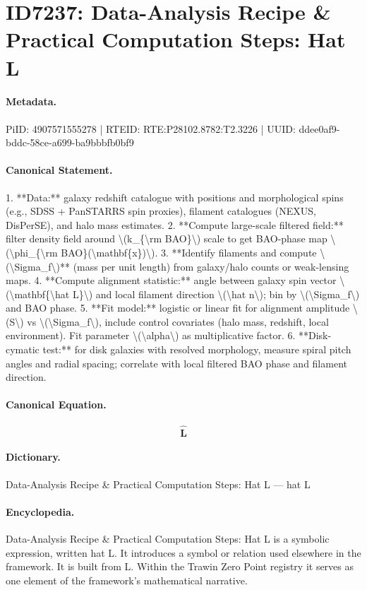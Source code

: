 \section*{ID7237: Data-Analysis Recipe \& Practical Computation Steps: Hat L}
\paragraph{Metadata.}
PiID: 4907571555278 | RTEID: RTE:P28102.8782:T2.3226 | UUID: ddee0af9-bddc-58ce-a699-ba9bbbfb0bf9

\paragraph{Canonical Statement.}
1. **Data:** galaxy redshift catalogue with positions and morphological spins (e.g., SDSS + PanSTARRS spin proxies), filament catalogues (NEXUS, DisPerSE), and halo mass estimates. 2. **Compute large-scale filtered field:** filter density field around \textbackslash{}(k\_\{\textbackslash{}rm BAO\}\textbackslash{}) scale to get BAO-phase map \textbackslash{}(\textbackslash{}phi\_\{\textbackslash{}rm BAO\}(\textbackslash{}mathbf\{x\})\textbackslash{}). 3. **Identify filaments and compute \textbackslash{}(\textbackslash{}Sigma\_f\textbackslash{})** (mass per unit length) from galaxy/halo counts or weak-lensing maps. 4. **Compute alignment statistic:** angle between galaxy spin vector \textbackslash{}(\textbackslash{}mathbf\{\textbackslash{}hat L\}\textbackslash{}) and local filament direction \textbackslash{}(\textbackslash{}hat n\textbackslash{}); bin by \textbackslash{}(\textbackslash{}Sigma\_f\textbackslash{}) and BAO phase. 5. **Fit model:** logistic or linear fit for alignment amplitude \textbackslash{}(S\textbackslash{}) vs \textbackslash{}(\textbackslash{}Sigma\_f\textbackslash{}), include control covariates (halo mass, redshift, local environment). Fit parameter \textbackslash{}(\textbackslash{}alpha\textbackslash{}) as multiplicative factor. 6. **Disk-cymatic test:** for disk galaxies with resolved morphology, measure spiral pitch angles and radial spacing; correlate with local filtered BAO phase and filament direction.

\paragraph{Canonical Equation.}
\[
\mathbf{\hat L}
\]

\paragraph{Dictionary.}
Data-Analysis Recipe \& Practical Computation Steps: Hat L — hat L

\paragraph{Encyclopedia.}
Data-Analysis Recipe \& Practical Computation Steps: Hat L is a symbolic expression, written hat L. It introduces a symbol or relation used elsewhere in the framework. It is built from L. Within the Trawin Zero Point registry it serves as one element of the framework's mathematical narrative.
